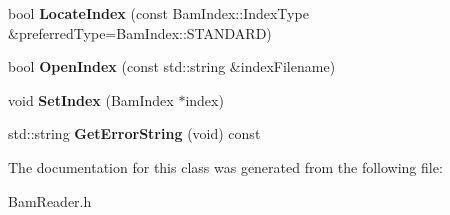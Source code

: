 \begin{DoxyCompactItemize}
\item 
\hypertarget{classBamTools_1_1BamReader_acc7a3f833ff9387dc97985f41805cd89}{bool {\bfseries Locate\-Index} (const Bam\-Index\-::\-Index\-Type \&preferred\-Type=Bam\-Index\-::\-S\-T\-A\-N\-D\-A\-R\-D)}\label{classBamTools_1_1BamReader_acc7a3f833ff9387dc97985f41805cd89}

\item 
\hypertarget{classBamTools_1_1BamReader_ab22bc96981f20ff059b8c1749e38fb6d}{bool {\bfseries Open\-Index} (const std\-::string \&index\-Filename)}\label{classBamTools_1_1BamReader_ab22bc96981f20ff059b8c1749e38fb6d}

\item 
\hypertarget{classBamTools_1_1BamReader_a28710a6b8632a68eb360d228066773a6}{void {\bfseries Set\-Index} (Bam\-Index $\ast$index)}\label{classBamTools_1_1BamReader_a28710a6b8632a68eb360d228066773a6}

\item 
\hypertarget{classBamTools_1_1BamReader_a53c5d2b3f24d571c14addd2287ea871a}{std\-::string {\bfseries Get\-Error\-String} (void) const }\label{classBamTools_1_1BamReader_a53c5d2b3f24d571c14addd2287ea871a}

\end{DoxyCompactItemize}


The documentation for this class was generated from the following file\-:\begin{DoxyCompactItemize}
\item 
Bam\-Reader.\-h\end{DoxyCompactItemize}
